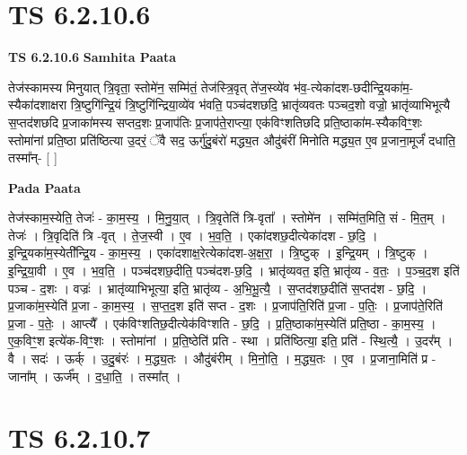 \documentclass[17pt]{extarticle}
\begin{document}

\section{ TS 6.2.10.6 }

\textbf{TS 6.2.10.6 } \newline
\textbf{Samhita Paata} \newline

तेज॑स्कामस्य मिनुयात् त्रि॒वृता॒ स्तोमे॑न॒ सम्मि॑तं॒ तेज॑स्त्रि॒वृत् ते॑ज॒स्व्ये॑व भ॑व॒-त्येका॑दश-छदीन्द्रि॒यका॑म॒-स्यैका॑दशाक्षरा त्रि॒ष्टुगि॑न्द्रि॒यं त्रि॒ष्टुगि॑न्द्रिया॒व्ये॑व भ॑वति॒ पञ्च॑दशछदि॒ भ्रातृ॑व्यवतः पञ्चद॒शो वज्रो॒ भ्रातृ॑व्याभिभूत्यै स॒प्तद॑शछदि प्र॒जाका॑मस्य सप्तद॒शः प्र॒जाप॑तिः प्र॒जाप॑ते॒राप्त्या॒ एक॑विꣳशतिछदि प्रति॒ष्ठाका॑म-स्यैकविꣳ॒॒शः स्तोमा॑नां प्रति॒ष्ठा प्रति॑ष्ठित्या उ॒दरं॒ ॅवै सद॒ ऊर्गु॑दु॒बंरो॑ मद्ध्य॒त औदु॑बंरीं मिनोति मद्ध्य॒त ए॒व प्र॒जाना॒मूर्जं॑ दधाति॒ तस्मा᳚न्- [  ] \newline

\textbf{Pada Paata} \newline

तेज॑स्काम॒स्येति॒ तेजः॑ - का॒म॒स्य॒ । मि॒नु॒या॒त् । त्रि॒वृतेति॑ त्रि-वृता᳚ । स्तोमे॑न । सम्मि॑त॒मिति॒ सं - मि॒त॒म् । तेजः॑ । त्रि॒वृदिति॑ त्रि -वृत् । ते॒ज॒स्वी । ए॒व । भ॒व॒ति॒ । एका॑दशछ॒दीत्येका॑दश - छ॒दि॒ । इ॒न्द्रि॒यका॑म॒स्येती᳚न्द्रि॒य - का॒म॒स्य॒ । एका॑दशाक्ष॒रेत्येका॑दश-अ॒क्ष॒रा॒ । त्रि॒ष्टुक् । इ॒न्द्रि॒यम् । त्रि॒ष्टुक् । इ॒न्द्रि॒या॒वी । ए॒व । भ॒व॒ति॒ । पञ्च॑दशछ॒दीति॒ पञ्च॑दश-छ॒दि॒ । भ्रातृ॑व्यवत॒ इति॒ भ्रातृ॑व्य - व॒तः॒ । प॒ञ्च॒द॒श इति॑ पञ्च - द॒शः । वज्रः॑ । भ्रातृ॑व्याभिभूत्या॒ इति॒ भ्रातृ॑व्य - अ॒भि॒भू॒त्यै॒ । स॒प्तद॑शछ॒दीति॑ स॒प्तद॑श - छ॒दि॒ । प्र॒जाका॑म॒स्येति॑ प्र॒जा - का॒म॒स्य॒ । स॒प्त॒द॒श इति॑ सप्त - द॒शः । प्र॒जाप॑ति॒रिति॑ प्र॒जा - प॒तिः॒ । प्र॒जाप॑ते॒रिति॑ प्र॒जा - प॒तेः॒ । आप्त्यै᳚ । एक॑विꣳशतिछ॒दीत्येक॑विꣳशति - छ॒दि॒ । प्र॒ति॒ष्ठाका॑म॒स्येति॑ प्रति॒ष्ठा - का॒म॒स्य॒ । ए॒क॒विꣳ॒॒श इत्ये॑क-विꣳ॒॒शः । स्तोमा॑नां । प्र॒ति॒ष्ठेति॑ प्रति - स्था । प्रति॑ष्ठित्या॒ इति॒ प्रति॑ - स्थि॒त्यै॒ । उ॒दर᳚म् । वै । सदः॑ । ऊर्क् । उ॒दु॒बंरः॑ । म॒द्ध्य॒तः । औदु॑बंरीम् । मि॒नो॒ति॒ । म॒द्ध्य॒तः । ए॒व । प्र॒जाना॒मिति॑ प्र - जाना᳚म् । ऊर्ज᳚म् । द॒धा॒ति॒ । तस्मा᳚त् ।  \newline





\section{ TS 6.2.10.7 }
\end{document}
